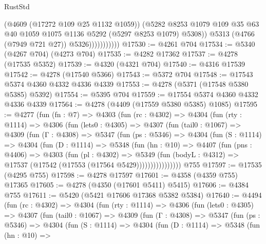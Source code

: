 \begin{lexlean}{RustStd}
\begin{coremodule}
                            (@4609 (@17272 @109 @25 @1132 @1059))
                            (@5282
                              @8253
                              @1079
                              @109
                              @35
                              @63
                              @40
                              @1059
                              @1075
                              @1136
                              @5292
                              (@5297 @8253 @1079)
                              @5308))
                          @5313
                          (@4766 (@7949 @721 @27))
                          @5326)))))))))))
@17530 := @4261 @704
@17534 := @5340 (@4267 @704) (@4273 @704)
@17535 := @4282 @17362
@17537 := @4278 (@17535 @5352)
@17539 := @4320 (@4321 @704)
@17540 := @4316 @17539
@17542 := @4278 (@17540 @5366)
@17543 := @5372 @704
@17548 := @17543 @5374 @4360 @4332 @4336 @4339
@17553 := @4278 (@5371 (@17548 @5380 @5385) @5392)
@17554 := @5395 @704
@17559 := @17554 @5374 @4360 @4332 @4336 @4339
@17564 := @4278 (@4409 (@17559 @5380 @5385) @1085)
@17595 := @4277
    (fun (fn : @7) =>
    @4303
      (fun (rc : @4302) =>
      @4304
        (fun (rty : @1114) =>
        @4306
          (fun (lets0 : @4305) =>
          @4307
            (fun (tail0 : @1067) =>
            @4309
              (fun (Γ : @4308) =>
              @5347
                (fun (ps : @5346) =>
                @4304
                  (fun (S : @1114) =>
                  @4304
                    (fun (D : @1114) =>
                    @5348
                      (fun (hn : @10) =>
                      @4407
                        (fun (pns : @4406) =>
                        @4303
                          (fun (pl : @4302) =>
                          @5349
                            (fun (bodyL : @4312) =>
                            @17537 (@17542 (@17553 (@17564 @5429))))))))))))))))
    @755
@17597 := @17535 (@4295 @755)
@17598 := @4278 @17597
@17601 := @4358 (@4359 @755) @17365
@17605 := @4278 (@4350 (@17601 @5411) @5415)
@17606 := @4384 @755
@17611 := @5420 (@5421 @17606 @17368 @5382 @5384)
@17640 := @4494
    (fun (rc : @4302) =>
    @4304
      (fun (rty : @1114) =>
      @4306
        (fun (lets0 : @4305) =>
        @4307
          (fun (tail0 : @1067) =>
          @4309
            (fun (Γ : @4308) =>
            @5347
              (fun (ps : @5346) =>
              @4304
                (fun (S : @1114) =>
                @4304
                  (fun (D : @1114) =>
                  @5348
                    (fun (hn : @10) =>

\end{coremodule}
\end{lexlean}
